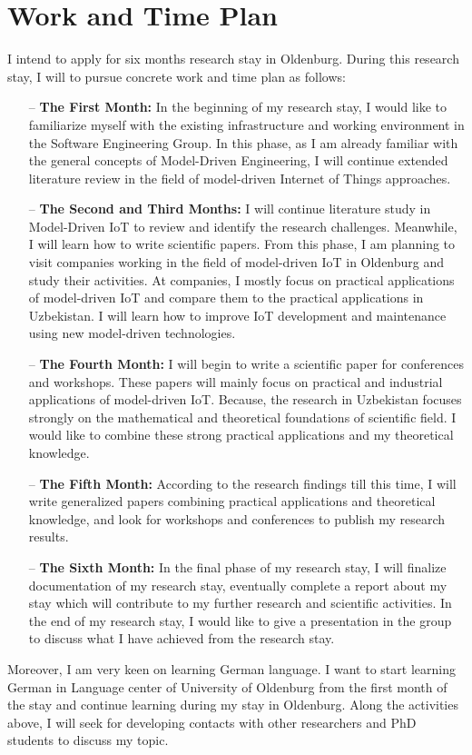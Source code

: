 \documentclass[10pt, oneside]{article}
\begin{document}
\section{Work and Time Plan}
I intend to apply for six months research stay in Oldenburg. During this research stay, I will to pursue concrete work and time plan as follows:
\begin{itemize}
\item[--] \textbf{The First Month:} In the beginning of my research stay, I would like to familiarize myself with the existing infrastructure and working environment in the Software Engineering Group. In this phase, as I am already familiar with the general concepts of Model-Driven Engineering, I will continue extended literature review in the field of model-driven Internet of Things approaches.
\item[--] \textbf{The Second and Third Months:} I will continue literature study in Model-Driven IoT to review and identify the research challenges. Meanwhile, I will learn how to write scientific papers. From this phase, I am planning to visit companies working in the field of model-driven IoT in Oldenburg and study their activities. At companies, I mostly focus on practical applications of model-driven IoT and compare them to the practical applications in Uzbekistan. I will learn how to improve IoT development and maintenance using new model-driven technologies.
\item[--] \textbf{The Fourth Month:} I will begin to write a scientific paper for conferences and workshops. These papers will mainly focus on practical and industrial applications of model-driven IoT. Because, the research in Uzbekistan focuses strongly on the mathematical and theoretical foundations of scientific field. I would like to combine these strong practical applications and my theoretical knowledge.
\item[--] \textbf{The Fifth Month:} According to the research findings till this time, I will write generalized papers combining practical applications and theoretical knowledge, and look for workshops and conferences to publish my research results. 
\item[--] \textbf{The Sixth Month:} In the final phase of my research stay, I will finalize documentation of my research stay, eventually complete a report about my stay which will contribute to my further research and scientific activities. In the end of my research stay, I would like to give a presentation in the group to discuss what I have achieved from the research stay.
\end{itemize}
Moreover, I am very keen on learning German language. I want to start learning German in Language center of University of Oldenburg from the first month of the stay and continue learning during my stay in Oldenburg. Along the activities above, I will seek for developing contacts with other researchers and PhD students to discuss my topic.
\end{document}
